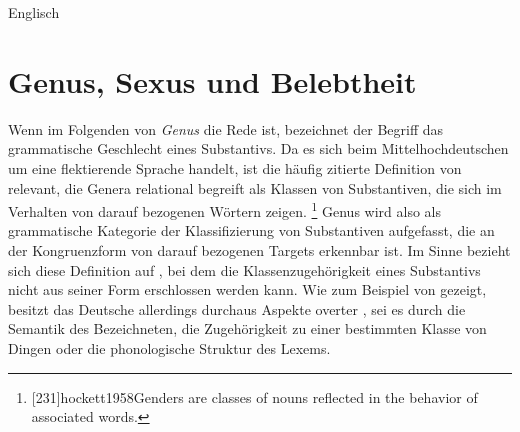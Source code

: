 \begin{exe}
\ex\label{ex:engartdiscong}
	\langinfo%
		{Englisch}
		{}
		{\cite[nach][70]{kingdalrymple2004}}
	\begin{xlist}
		\label{ex:engartdiscong_1}
		\label{ex:engartdiscong_2}
		\label{ex:engartdiscong_3}
		\label{ex:engartdiscong_4}
	\end{xlist}
\end{exe}


\section{Genus, Sexus und Belebtheit}
\label{sec:gendsex}


Wenn im Folgenden von \textit{Genus} die Rede ist, bezeichnet der Begriff das
grammatische Geschlecht eines Substantivs. Da es sich beim
Mittelhochdeutschen um eine flektierende Sprache handelt,
ist die häufig zitierte Definition von \citet[231]{hockett1958} relevant, die
Genera relational begreift als Klassen von Substantiven, die sich im Verhalten
von darauf bezogenen Wörtern zeigen.%
%
	\footnote{[231]{hockett1958}{Genders are classes
		of nouns reflected in the behavior of associated words}.}
%
Genus wird also als grammatische Kategorie der Klassifizierung von Substantiven
aufgefasst, die an der Kongruenzform von darauf bezogenen Targets erkennbar
ist. Im Sinne  bezieht sich diese Definition auf
, bei dem die Klassenzugehörigkeit eines
Substantivs nicht aus seiner Form erschlossen werden kann. Wie zum Beispiel von
\citet{koepckezubin2017} gezeigt, besitzt das Deutsche
allerdings durchaus Aspekte overter , sei es durch die
Semantik des Bezeichneten, die Zugehörigkeit zu einer bestimmten Klasse von
Dingen oder die phonologische Struktur des Lexems.

